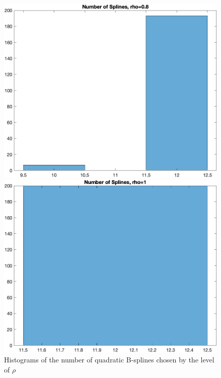 \documentclass[
]{article}
\begin{document}
\begin{figure}
\begin{minipage}{0.50\linewidth}
\includegraphics{../figures/hist_n_spli_rho-0.8_quadratic_splines.png}\end{minipage}%
%
\begin{minipage}{0.50\linewidth}
\includegraphics{../figures/hist_n_spli_rho-1_quadratic_splines.png}\end{minipage}%

\caption{\label{fig-hist-n-splies}Histograms of the number of quadratic
B-splines chosen by the level of \(\rho\)}

\end{figure}%
\end{document}
